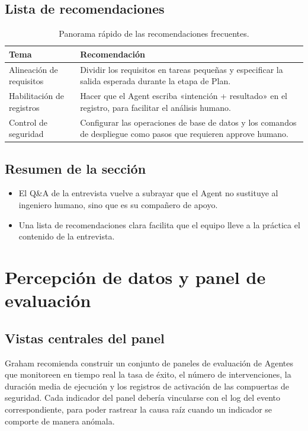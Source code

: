 \documentclass[a4paper]{article}
\begin{document}
\subsection{Lista de recomendaciones}
\begin{table}[H]
\centering
\begin{tabular}{p{} p{}}
\toprule
Tema & Recomendación \\
\midrule
Alineación de requisitos & Dividir los requisitos en tareas pequeñas y especificar la salida esperada durante la etapa de Plan. \\
\midrule
Habilitación de registros & Hacer que el Agent escriba «intención + resultado» en el registro, para facilitar el análisis humano. \\
\midrule
Control de seguridad & Configurar las operaciones de base de datos y los comandos de despliegue como pasos que requieren approve humano. \\
\bottomrule
\end{tabular}
\caption{Panorama rápido de las recomendaciones frecuentes.}
\end{table}

\subsection{Resumen de la sección}
\begin{itemize}
    \item El Q\&A de la entrevista vuelve a subrayar que el Agent no sustituye al ingeniero humano, sino que es su compañero de apoyo.
    \item Una lista de recomendaciones clara facilita que el equipo lleve a la práctica el contenido de la entrevista.
\end{itemize}

\section{Percepción de datos y panel de evaluación}
\subsection{Vistas centrales del panel}
Graham recomienda construir un conjunto de paneles de evaluación de Agentes que monitoreen en tiempo real la tasa de éxito, el número de intervenciones, la duración media de ejecución y los registros de activación de las compuertas de seguridad. Cada indicador del panel debería vincularse con el log del evento correspondiente, para poder rastrear la causa raíz cuando un indicador se comporte de manera anómala.
\end{document}
